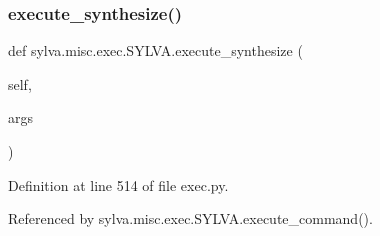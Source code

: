 \subsubsection{\texorpdfstring{execute\+\_\+synthesize()}{execute\_synthesize()}}
{\footnotesize\ttfamily def sylva.\+misc.\+exec.\+S\+Y\+L\+V\+A.\+execute\+\_\+synthesize (\begin{DoxyParamCaption}\item[{}]{self,  }\item[{}]{args }\end{DoxyParamCaption})}



Definition at line 514 of file exec.\+py.



Referenced by sylva.\+misc.\+exec.\+S\+Y\+L\+V\+A.\+execute\+\_\+command().


